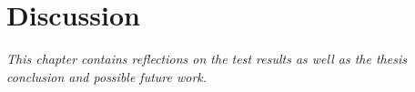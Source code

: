 \chapter{Discussion}
\textit{This chapter contains reflections on the test results as well as the thesis conclusion and possible future work.}








